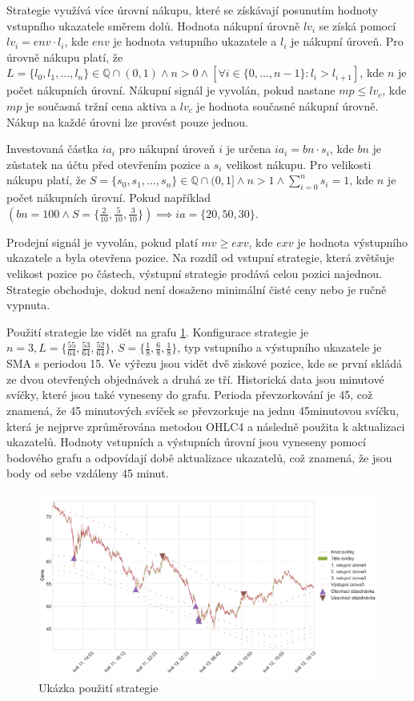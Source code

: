 Strategie využívá více úrovní nákupu, které se získávají posunutím hodnoty vstupního ukazatele směrem dolů.
Hodnota nákupní úrovně $lv_i$ se získá pomocí $lv_i=env \cdot l_i$, kde $env$ je hodnota vstupního ukazatele a $l_i$ je nákupní úroveň.
Pro úrovně nákupu platí, že $L=\{l_0, l_1,\dots,l_n\} \in \mathbb{Q} \cap (0, 1) \land n>0 \land [\forall i \in \{0,\dots,n-1\} : l_i > l_{i+1}]$, kde $n$ je počet nákupních úrovní.
Nákupní signál je vyvolán, pokud nastane $mp\leq lv_c$, kde $mp$ je současná tržní cena aktiva a $lv_c$ je hodnota současné nákupní úrovně.
Nákup na každé úrovni lze provést pouze jednou.

Investovaná částka $ia_i$ pro nákupní úroveň $i$ je určena $ia_i=bn \cdot s_i$, kde $bn$ je zůstatek na účtu před otevřením pozice a $s_i$ velikost nákupu.
Pro velikosti nákupu platí, že $ S = \{s_0, s_1,\dots,s_n\} \in \mathbb{Q} \cap (0, 1] \land n>1 \land \sum_{i=0}^{n} s_i = 1 $, kde $n$ je počet nákupních úrovní.
Pokud například $(bn=100 \land S = \{\frac{2}{10}, \frac{5}{10}, \frac{3}{10}\})\implies ia=\{20, 50, 30\}$.

Prodejní signál je vyvolán, pokud platí $mv\geq exv$, kde $exv$ je hodnota výstupního ukazatele a byla otevřena pozice.
Na rozdíl od vstupní strategie, která zvětšuje velikost pozice po částech, výstupní strategie prodává celou pozici najednou.
Strategie obchoduje, dokud není dosaženo minimální čisté ceny nebo je ručně vypnuta.

Použití strategie lze vidět na grafu \ref{fig:bazooka:example}.
Konfigurace strategie je $n=3, L=\{\frac{55}{64}, \frac{53}{64}, \frac{52}{64}\}$, $S=\{\frac{1}{8}, \frac{6}{8}, \frac{1}{8}\}$, typ vstupního a výstupního ukazatele je SMA s periodou 15.
Ve výřezu jsou vidět dvě ziskové pozice, kde se první skládá ze dvou otevřených objednávek a druhá ze tří.
Historická data jsou minutové svíčky, které jsou také vyneseny do grafu.
Perioda převzorkování je 45, což znamená, že 45 minutových svíček se převzorkuje na jednu 45minutovou svíčku, která je nejprve zprůměrována metodou OHLC4 a následně použita k aktualizaci ukazatelů.
Hodnoty vstupních a výstupních úrovní jsou vyneseny pomocí bodového grafu a odpovídají době aktualizace ukazatelů, což znamená, že jsou body od sebe vzdáleny 45 minut.

\begin{figure}[htbp]
\centerline{\includegraphics[scale=0.42]{img/bazooka-example.png}}
\caption{Ukázka použití strategie}
\label{fig:bazooka:example}
\end{figure}

